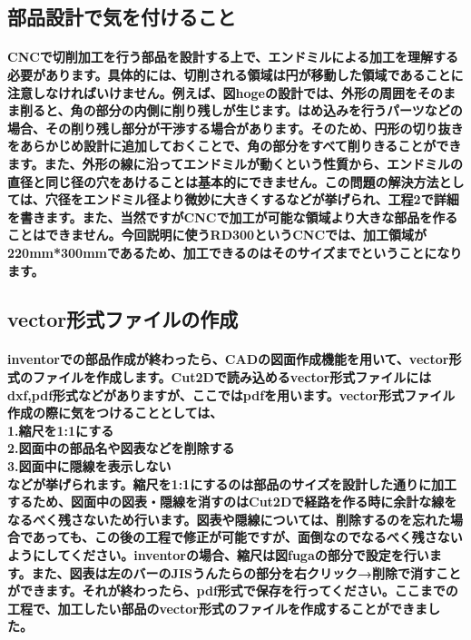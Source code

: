 \documentclass[b5paper, 9pt, twocolumn, titlepage,openany]{jsbook}%
\begin{document}

\subsection{部品設計で気を付けること}
\paragraph{CNCで切削加工を行う部品を設計する上で、エンドミルによる加工を理解する必要があります。具体的には、切削される領域は円が移動した領域であることに注意しなければいけません。例えば、図hogeの設計では、外形の周囲をそのまま削ると、角の部分の内側に削り残しが生じます。はめ込みを行うパーツなどの場合、その削り残し部分が干渉する場合があります。そのため、円形の切り抜きをあらかじめ設計に追加しておくことで、角の部分をすべて削りきることができます。また、外形の線に沿ってエンドミルが動くという性質から、エンドミルの直径と同じ径の穴をあけることは基本的にできません。この問題の解決方法としては、穴径をエンドミル径より微妙に大きくするなどが挙げられ、工程2で詳細を書きます。また、当然ですがCNCで加工が可能な領域より大きな部品を作ることはできません。今回説明に使うRD300というCNCでは、加工領域が220mm*300mmであるため、加工できるのはそのサイズまでということになります。}


\subsection{vector形式ファイルの作成}
\paragraph{inventorでの部品作成が終わったら、CADの図面作成機能を用いて、vector形式のファイルを作成します。Cut2Dで読み込めるvector形式ファイルにはdxf,pdf形式などがありますが、ここではpdfを用います。vector形式ファイル作成の際に気をつけることとしては、\\
  1.縮尺を1:1にする\\
  2.図面中の部品名や図表などを削除する\\
  3.図面中に隠線を表示しない\\
  などが挙げられます。縮尺を1:1にするのは部品のサイズを設計した通りに加工するため、図面中の図表・隠線を消すのはCut2Dで経路を作る時に余計な線をなるべく残さないため行います。図表や隠線については、削除するのを忘れた場合であっても、この後の工程で修正が可能ですが、面倒なのでなるべく残さないようにしてください。inventorの場合、縮尺は図fugaの部分で設定を行います。また、図表は左のバーのJISうんたらの部分を右クリック→削除で消すことができます。それが終わったら、pdf形式で保存を行ってください。ここまでの工程で、加工したい部品のvector形式のファイルを作成することができました。}
\end{document}
